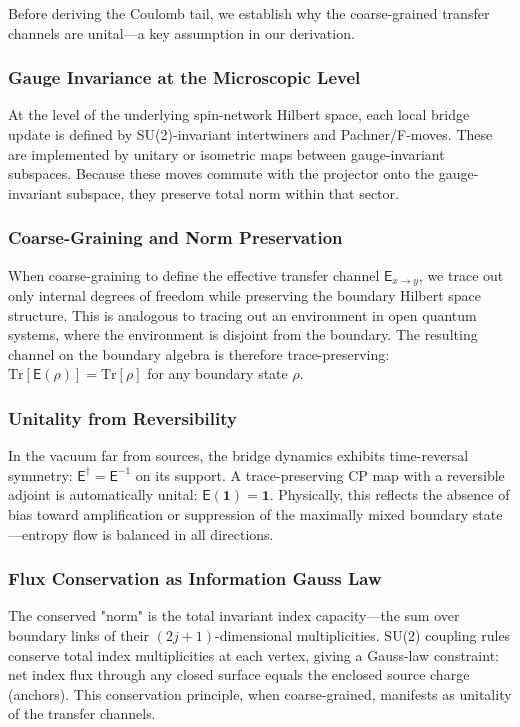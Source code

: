 \documentclass[11pt]{article}
\theoremstyle{plain}
\theoremstyle{definition}
\begin{document}
Before deriving the Coulomb tail, we establish why the coarse-grained transfer channels are unital—a key assumption in our derivation.

\subsubsection{Gauge Invariance at the Microscopic Level}
At the level of the underlying spin-network Hilbert space, each local bridge update is defined by SU(2)-invariant intertwiners and Pachner/F-moves. These are implemented by unitary or isometric maps between gauge-invariant subspaces. Because these moves commute with the projector onto the gauge-invariant subspace, they preserve total norm within that sector.

\subsubsection{Coarse-Graining and Norm Preservation}
When coarse-graining to define the effective transfer channel $\mathsf{E}_{x\to y}$, we trace out only internal degrees of freedom while preserving the boundary Hilbert space structure. This is analogous to tracing out an environment in open quantum systems, where the environment is disjoint from the boundary. The resulting channel on the boundary algebra is therefore trace-preserving: $\mathrm{Tr}[\mathsf{E}(\rho)] = \mathrm{Tr}[\rho]$ for any boundary state $\rho$.

\subsubsection{Unitality from Reversibility}
In the vacuum far from sources, the bridge dynamics exhibits time-reversal symmetry: $\mathsf{E}^\dagger = \mathsf{E}^{-1}$ on its support. A trace-preserving CP map with a reversible adjoint is automatically unital: $\mathsf{E}(\mathbf{1}) = \mathbf{1}$. Physically, this reflects the absence of bias toward amplification or suppression of the maximally mixed boundary state—entropy flow is balanced in all directions.

\subsubsection{Flux Conservation as Information Gauss Law}
The conserved "norm" is the total invariant index capacity—the sum over boundary links of their $(2j+1)$-dimensional multiplicities. SU(2) coupling rules conserve total index multiplicities at each vertex, giving a Gauss-law constraint: net index flux through any closed surface equals the enclosed source charge (anchors). This conservation principle, when coarse-grained, manifests as unitality of the transfer channels.
\end{document}
